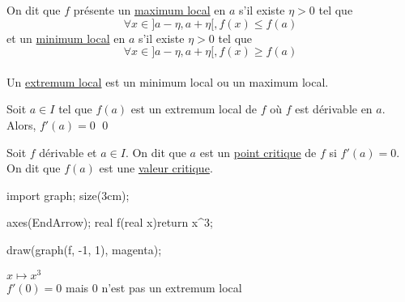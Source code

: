 \begin{defn}
	On dit que $f$ présente un \underline{maximum local} en $a$ s'il existe $\eta>0$ tel que \[
		\forall x \in ]a-\eta,a+\eta[, f(x) \le f(a)
	\] et un \underline{minimum local} en $a$ s'il existe $\eta >0$ tel que \[
		\forall x \in ]a-\eta, a+\eta[, f(x) \ge f(a)
	\]\\
	Un \underline{extremum local} est un minimum local ou un maximum local.
\end{defn}

\begin{prop}
	Soit $a \in I$ tel que $f(a)$ est un extremum local de $f$ où $f$ est dérivable en $a$. Alors, $f'(a) = 0$
	\qed
\end{prop}

\begin{defn}
	Soit $f$ dérivable et $a \in I$. On dit que $a$ est un \underline{point critique} de $f$ si $f'(a) = 0$. On dit que $f(a)$ est une \underline{valeur critique}.
\end{defn}

\begin{exm}
	\begin{center}
		\begin{asy}
			import graph;
			size(3cm);

			axes(EndArrow);
			real f(real x){return x^3;}

			draw(graph(f, -1, 1), magenta);
		\end{asy}
	\end{center}
	$x \mapsto x^3$\\
	$f'(0) = 0$ mais $0$ n'est pas un extremum local
\end{exm}

